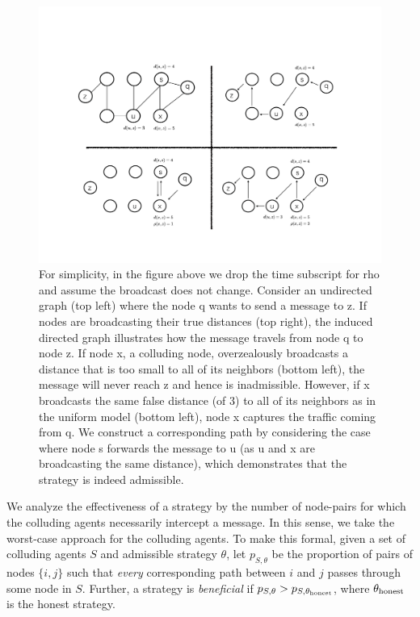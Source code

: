 \documentclass{comnet}
\begin{document}
\begin{figure}
\centering
\includegraphics[width=\textwidth]{images/bgppanel2.pdf}
\caption{For simplicity, in the figure above we drop the time subscript for rho and assume the broadcast does not change.  Consider an undirected graph (top left) where the node q wants to send a message to z.  If nodes are broadcasting their true distances (top right), the induced directed graph illustrates how the message travels from node q to node z.  If node x, a colluding node, overzealously broadcasts a distance that is too small to all of its neighbors (bottom left), the message will never reach z and hence is inadmissible.  However, if x broadcasts the same false distance (of 3) to all of its neighbors as in the uniform model (bottom left), node x captures the traffic coming from q.  We construct a corresponding path by considering the case where node s forwards the message to u (as u and x are broadcasting the same distance), which demonstrates that the strategy is indeed admissible.}
\label{fig:admissibility}
\end{figure}

We analyze the effectiveness of a strategy by the number of node-pairs for which the colluding agents necessarily intercept a message. In this sense, we take the worst-case approach for the colluding agents. To make this formal, given a set of colluding agents $S$ and admissible strategy $\theta$, let $p_{S,\theta}$ be the proportion of pairs of nodes $\{i, j\}$ such that {\em every} corresponding path between $i$ and $j$ passes through some node in $S$. Further, a strategy is \emph{beneficial} if $p_{S,\theta} > p_{S, \theta_{\textup{honest}}}$, where $\theta_{\textup{honest}}$ is the honest strategy.
\end{document}
